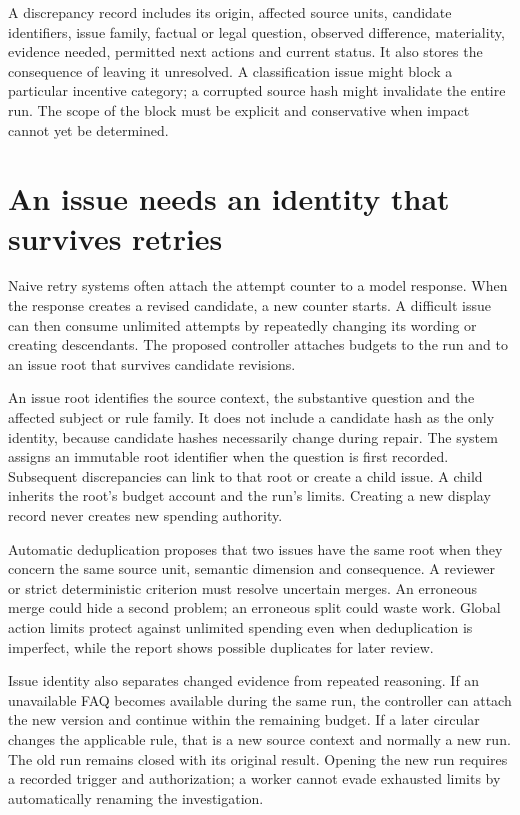A discrepancy record includes its origin, affected source units, candidate
identifiers, issue family, factual or legal question, observed difference,
materiality, evidence needed, permitted next actions and current status. It also
stores the consequence of leaving it unresolved. A classification issue might
block a particular incentive category; a corrupted source hash might invalidate
the entire run. The scope of the block must be explicit and conservative when
impact cannot yet be determined.

\section{An issue needs an identity that survives retries}
\label{merge:M06:06}


Naive retry systems often attach the attempt counter to a model response. When
the response creates a revised candidate, a new counter starts. A difficult issue
can then consume unlimited attempts by repeatedly changing its wording or
creating descendants. The proposed controller attaches budgets to the run and to
an issue root that survives candidate revisions.

An issue root identifies the source context, the substantive question and the
affected subject or rule family. It does not include a candidate hash as the only
identity, because candidate hashes necessarily change during repair. The system
assigns an immutable root identifier when the question is first recorded.
Subsequent discrepancies can link to that root or create a child issue. A child
inherits the root's budget account and the run's limits. Creating a new display
record never creates new spending authority.


Automatic deduplication proposes that two issues have the same root when they
concern the same source unit, semantic dimension and consequence. A reviewer or
strict deterministic criterion must resolve uncertain merges. An erroneous merge
could hide a second problem; an erroneous split could waste work. Global action
limits protect against unlimited spending even when deduplication is imperfect,
while the report shows possible duplicates for later review.

Issue identity also separates changed evidence from repeated reasoning. If an
unavailable FAQ becomes available during the same run, the controller can attach
the new version and continue within the remaining budget. If a later circular
changes the applicable rule, that is a new source context and normally a new run.
The old run remains closed with its original result. Opening the new run requires
a recorded trigger and authorization; a worker cannot evade exhausted limits by
automatically renaming the investigation.

